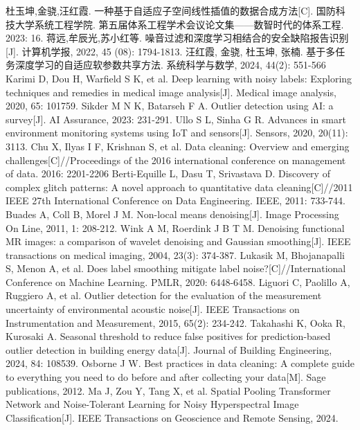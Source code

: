 \documentclass{NauThesis}
\begin{document}
\begin{thebibliography}{99}
\setlength{\baselineskip}{10pt}{\setlength\arraycolsep{2pt}}
杜玉坤,金骁,汪红霞. 一种基于自适应子空间线性插值的数据合成方法[C]. 国防科技大学系统工程学院. 第五届体系工程学术会议论文集——数智时代的体系工程. 2023: 16.
蒋远,牟辰光,苏小红等. 噪音过滤和深度学习相结合的安全缺陷报告识别 [J]. 计算机学报, 2022, 45 (08): 1794-1813.
汪红霞, 金骁, 杜玉坤, 张楠. 基于多任务深度学习的自适应软参数共享方法. 系统科学与数学, 2024, 44(2): 551-566 
Karimi D, Dou H, Warfield S K, et al. Deep learning with noisy labels: Exploring techniques and remedies in medical image analysis[J]. Medical image analysis, 2020, 65: 101759.
Sikder M N K, Batarseh F A. Outlier detection using AI: a survey[J]. AI Assurance, 2023: 231-291.
Ullo S L, Sinha G R. Advances in smart environment monitoring systems using IoT and sensors[J]. Sensors, 2020, 20(11): 3113.
Chu X, Ilyas I F, Krishnan S, et al. Data cleaning: Overview and emerging challenges[C]//Proceedings of the 2016 international conference on management of data. 2016: 2201-2206
Berti-Equille L, Dasu T, Srivastava D. Discovery of complex glitch patterns: A novel approach to quantitative data cleaning[C]//2011 IEEE 27th International Conference on Data Engineering. IEEE, 2011: 733-744.
Buades A, Coll B, Morel J M. Non-local means denoising[J]. Image Processing On Line, 2011, 1: 208-212.
Wink A M, Roerdink J B T M. Denoising functional MR images: a comparison of wavelet denoising and Gaussian smoothing[J]. IEEE transactions on medical imaging, 2004, 23(3): 374-387.
Lukasik M, Bhojanapalli S, Menon A, et al. Does label smoothing mitigate label noise?[C]//International Conference on Machine Learning. PMLR, 2020: 6448-6458.
Liguori C, Paolillo A, Ruggiero A, et al. Outlier detection for the evaluation of the measurement uncertainty of environmental acoustic noise[J]. IEEE Transactions on Instrumentation and Measurement, 2015, 65(2): 234-242.
Takahashi K, Ooka R, Kurosaki A. Seasonal threshold to reduce false positives for prediction-based outlier detection in building energy data[J]. Journal of Building Engineering, 2024, 84: 108539.
Osborne J W. Best practices in data cleaning: A complete guide to everything you need to do before and after collecting your data[M]. Sage publications, 2012.
Ma J, Zou Y, Tang X, et al. Spatial Pooling Transformer Network and Noise-Tolerant Learning for Noisy Hyperspectral Image Classification[J]. IEEE Transactions on Geoscience and Remote Sensing, 2024.

\end{thebibliography}
\end{document}
